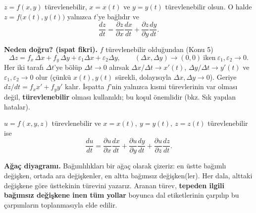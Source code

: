 \begin{teorem}
$z=f(x,y)$ türevlenebilir, $x=x(t)$ ve $y=y(t)$ türevlenebilir olsun. O halde $z=f\big(x(t),y(t)\big)$ yalnızca $t$'ye
bağlıdır ve
\[
\frac{dz}{dt}=\frac{\partial z}{\partial x}\frac{dx}{dt}+\frac{\partial z}{\partial y}\frac{dy}{dt}.
\]
\end{teorem}

\textbf{Neden doğru? (ispat fikri).} $f$ türevlenebilir olduğundan (Konu 5)
\[
\Delta z=f_x\,\Delta x+f_y\,\Delta y+\varepsilon_1\Delta x+\varepsilon_2\Delta y,\qquad
(\Delta x,\Delta y)\to(0,0)\ \text{iken}\ \varepsilon_1,\varepsilon_2\to0 .
\]
Her iki tarafı $\Delta t$'ye bölüp $\Delta t\to0$ alırsak $\Delta x/\Delta t\to x'(t)$, $\Delta y/\Delta t\to y'(t)$ ve
$\varepsilon_1,\varepsilon_2\to0$ olur (çünkü $x(t),y(t)$ sürekli, dolayısıyla $\Delta x,\Delta y\to0$). Geriye
$dz/dt=f_x x'+f_y y'$ kalır. İspatta $f$'nin yalnızca kısmi türevlerinin var olması değil, \textbf{türevlenebilir} olması
kullanıldı; bu koşul önemlidir (bkz. Sık yapılan hatalar).

\begin{teorem}
$u=f(x,y,z)$ türevlenebilir ve $x=x(t),\ y=y(t),\ z=z(t)$ türevlenebilir ise
\[
\frac{du}{dt}=\frac{\partial u}{\partial x}\frac{dx}{dt}+\frac{\partial u}{\partial y}\frac{dy}{dt}+\frac{\partial u}{\partial z}\frac{dz}{dt}.
\]
\end{teorem}

\textbf{Ağaç diyagramı.} Bağımlılıkları bir ağaç olarak çizeriz: en üstte bağımlı değişken, ortada ara değişkenler, en
altta bağımsız değişken(ler). Her dala, alttaki değişkene göre üsttekinin türevini yazarız. Aranan türev,
\textbf{tepeden ilgili bağımsız değişkene inen tüm yollar} boyunca dal etiketlerinin çarpılıp bu çarpımların
toplanmasıyla elde edilir.

\begin{center}
\end{center}

